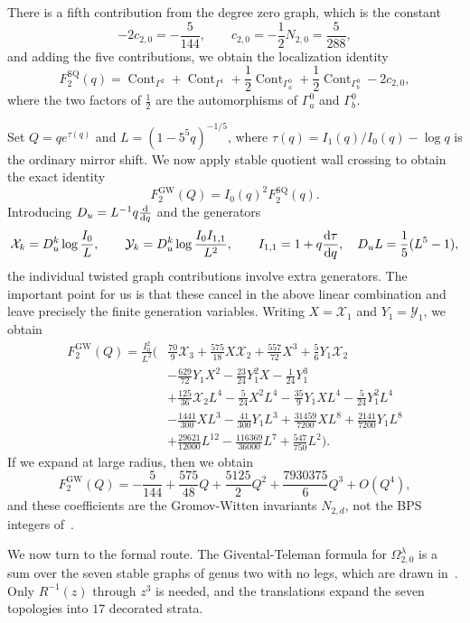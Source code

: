 \documentclass{amsart}
\theoremstyle{definition}
\theoremstyle{remark}
\theoremstyle{plain}
\theoremstyle{definition}
\theoremstyle{remark}
\newcommand{\mc}[1]{\mathcal{#1}}
\newcommand{\mr}[1]{\mathrm{#1}}
\newcommand{\1}{\mathbf{1}}
\newcommand{\2}{\mathbf{2}}
\newcommand{\3}{\mathbf{3}}
\DeclareMathOperator{\Cont}{Cont}
\begin{document}
There is a fifth contribution from the degree zero graph, which is the constant
\[ -2c_{2,0} = -\frac{5}{144}, \qquad c_{2,0} = -\frac{1}{2}N_{2,0} = \frac{5}{288}, \]
and adding the five contributions, we obtain the localization identity
\[ F_2^{\mr{SQ}}(q) = \Cont_{\Gamma^2} + \Cont_{\Gamma^1} + \frac{1}{2}\Cont_{\Gamma_a^0} + \frac{1}{2}\Cont_{\Gamma_b^0} - 2c_{2,0}, \]
where the two factors of \(\frac{1}{2}\) are the automorphisms of \(\Gamma_a^0\) and \(\Gamma_b^0\).

Set \(Q = qe^{\tau(q)}\) and \(L = (1-5^5q)^{-1/5}\), where \(\tau(q) = I_1(q)/I_0(q) - \log q\) is the ordinary mirror shift. We now apply stable quotient wall crossing to obtain the exact identity
\[ F_2^{\mr{GW}}(Q) = I_0(q)^2 F_2^{\mr{SQ}}(q). \]
Introducing \(D_u = L^{-1}q\odv{}{q}\) and the generators
\[ \mc{X}_k = D_u^k \log \frac{I_0}{L}, \qquad \mc{Y}_k = D_u^k \log \frac{I_0I_{1,1}}{L^2}, \qquad I_{1,1} = 1 + q \odv{\tau}{q}, \quad D_u L = \frac{1}{5}(L^5-1), \]
the individual twisted graph contributions involve extra generators. The important point for us is that these cancel in the above linear combination and leave precisely the finite generation variables. Writing \(X = \mc{X}_1\) and \(Y_1 = \mc{Y}_1\), we obtain
\begin{align*}
    F^{\mr{GW}}_2(Q) = \frac{I_0^2}{L^2}\Big(&\frac{70}{9}\mc{X}_3 + \frac{575}{18}X\mc{X}_2 + \frac{557}{72}X^3 + \frac{5}{6}Y_1\mc{X}_2 \\
    &- \frac{629}{72}Y_1X^2 - \frac{23}{24}Y_1^2 X - \frac{1}{24}Y_1^3 \\
    &+ \frac{125}{36}\mc{X}_2 L^4 - \frac{5}{24}X^2L^4 - \frac{35}{9}Y_1XL^4 - \frac{5}{24}Y_1^2L^4 \\
    &- \frac{1441}{300}XL^3 - \frac{41}{300}Y_1L^3 + \frac{31459}{7200}XL^8 + \frac{2141}{7200}Y_1L^8 \\
    &+ \frac{29621}{12000}L^{12} - \frac{116369}{36000}L^7 + \frac{547}{750}L^2\Big).
\end{align*}
If we expand at large radius, then we obtain
\[ F_2^{\mr{GW}}(Q) = -\frac{5}{144} + \frac{575}{48}Q + \frac{5125}{2}Q^2 + \frac{7930375}{6}Q^3 + O(Q^4), \]
and these coefficients are the Gromov-Witten invariants \(N_{2,d}\), not the BPS integers of~.

We now turn to the formal route. The Givental-Teleman formula for \(\Omega^{\lambda}_{2,0}\) is a sum over the seven stable graphs of genus two with no legs, which are drawn in~. Only \(R^{-1}(z)\) through \(z^3\) is needed, and the translations expand the seven topologies into \(17\) decorated strata.
\end{document}
